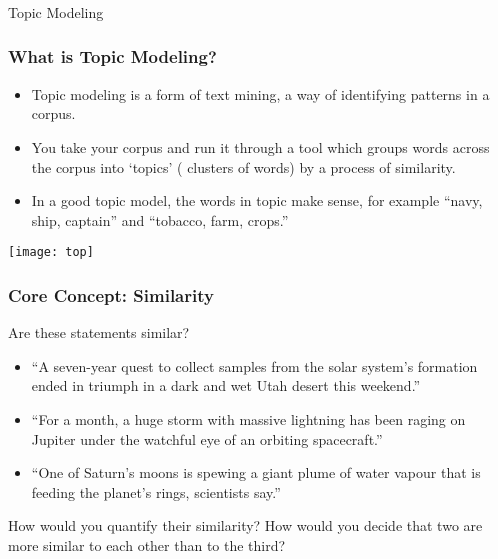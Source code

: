 \begin{frame}[fragile]\frametitle{}

\begin{center}
{\Large Topic Modeling}
\end{center}
\end{frame}

\begin{frame}[fragile]\frametitle{What is Topic Modeling?}
  \begin{itemize}
  	\item Topic modeling is a form of text mining, a way of identifying patterns in a corpus. 
	\item  You take your corpus and run it through a tool which groups words across the corpus into `topics' ( clusters of words) by a process of similarity.
	\item In a good topic model, the words in topic make sense, for example ``navy, ship, captain'' and ``tobacco, farm, crops.''
  \end{itemize}
\begin{center}
\texttt{[image: top]}
\end{center}
\end{frame}

\begin{frame}[fragile]\frametitle{Core Concept: Similarity}
Are these statements similar?
  \begin{itemize}
  	\item ``A seven-year quest to collect samples from the solar system's formation ended in triumph in a dark and wet Utah desert this weekend.''
	\item ``For a month, a huge storm with massive lightning has been raging on Jupiter under the watchful eye of an orbiting spacecraft.''
	\item ``One of Saturn's moons is spewing a giant plume of water vapour that is feeding the planet's rings, scientists say.''
  \end{itemize}
How would you quantify their similarity? How would you decide that two are more similar to each other than to the third? 

\end{frame}

